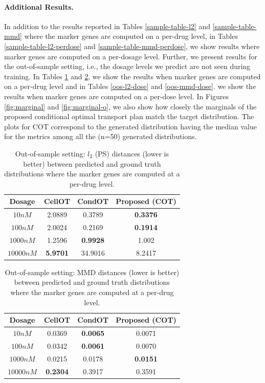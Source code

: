 \paragraph{Additional Results.} In addition to the results reported in Tables \ref{sample-table-l2} and \ref{sample-table-mmd} where the marker genes are computed on a per-drug level, in Tables \ref{sample-table-l2-perdose} and \ref{sample-table-mmd-perdose}, we show results where marker genes are computed on a per-dosage level.
Further, we present results for the out-of-sample setting, i.e., the dosage levels we predict are not seen during training. In Tables \ref{oos-l2} and \ref{oos-mmd}, we show the results when marker genes are computed on a per-drug level and in Tables \ref{oos-l2-dose} and \ref{oos-mmd-dose}. we show the results when marker genes are computed on a per-dose level. In Figures \ref{fig:marginal} and \ref{fig:marginal-o}, we also show how closely the marginals of the proposed conditional optimal transport plan match the target distribution. The plots for COT correspond to the generated distribution having the median value for the metrics among all the (n=50) generated distributions. 
\begin{table}[t]
  \caption{Out-of-sample setting: $l_2$ (PS) distances (lower is better) between predicted and ground truth distributions where the marker genes are computed at a per-drug level.}
  \label{oos-l2}
  \centering
  {
  \begin{tabular}{cccc}
    \toprule
        Dosage   & CellOT & CondOT & Proposed (COT) \\  
        \midrule
        $10nM$ & 2.0889 & 0.3789 & \textbf{0.3376} \\
        $100nM$ & 2.0024 & 0.2169 & \textbf{0.1914}\\
        $1000nM$ & 1.2596 & \textbf{0.9928} & 1.002 \\
        $10000nM$ & \textbf{5.9701} & 34.9016 & 8.2417  \\
        \bottomrule 
  \end{tabular}}
\end{table}

\begin{table}[t]
  \caption{Out-of-sample setting: MMD distances (lower is better) between predicted and ground truth distributions where the marker genes are computed at a per-drug level.}
  \label{oos-mmd}
  \centering
  {
  \begin{tabular}{cccc}
    \toprule
        Dosage   & CellOT & CondOT & Proposed (COT) \\  
        \midrule
        $10nM$ & 0.0369 & \textbf{0.0065} & 0.0071 \\
        $100nM$ & 0.0342 & \textbf{0.0061}  & 0.0070\\
        $1000nM$ & 0.0215 & 0.0178 & \textbf{0.0151} \\
        $10000nM$ & \textbf{0.2304} & 0.3917 & 0.3591  \\
        \bottomrule 
  \end{tabular}}
\end{table}

